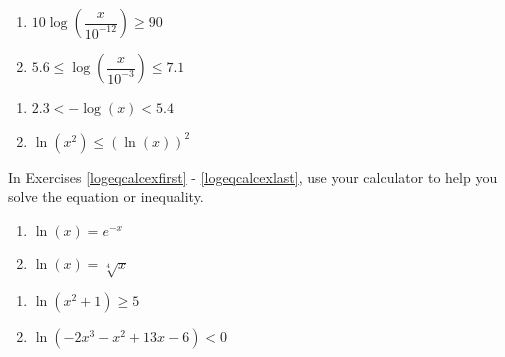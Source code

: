 \begin{multicols}{2}
\begin{enumerate}
\setcounter{enumi}{\value{HW}}

\item $10\log\left(\dfrac{x}{10^{-12}}\right) \geq 90$ \label{sixfourdecibelineq} 
\item $5.6 \leq \log\left(\dfrac{x}{10^{-3}}\right) \leq 7.1$ \label{sixfourRichterineq}


\setcounter{HW}{\value{enumi}}
\end{enumerate}
\end{multicols}

\begin{multicols}{2}
\begin{enumerate}
\setcounter{enumi}{\value{HW}}


\item $2.3 < -\log(x) < 5.4$ \label{sixfourpHineq} 

\item $\ln(x^{2}) \leq (\ln(x))^{2}$ \label{solvelogineqexlast} 

\setcounter{HW}{\value{enumi}}
\end{enumerate}
\end{multicols}

In Exercises \ref{logeqcalcexfirst} - \ref{logeqcalcexlast}, use your calculator to help you solve the equation or  inequality.

\begin{multicols}{2}
\begin{enumerate}
\setcounter{enumi}{\value{HW}}

\item $\ln(x) = e^{-x}$ \label{logeqcalcexfirst} 
\item $\ln(x) = \sqrt[4]{x}$ 

\setcounter{HW}{\value{enumi}}
\end{enumerate}
\end{multicols}

\begin{multicols}{2}
\begin{enumerate}
\setcounter{enumi}{\value{HW}}

\item $\ln(x^{2} + 1) \geq 5$
\item $\ln(-2x^{3} - x^{2} + 13x - 6) < 0$ \label{logeqcalcexlast} 

\setcounter{HW}{\value{enumi}}
\end{enumerate}
\end{multicols}

